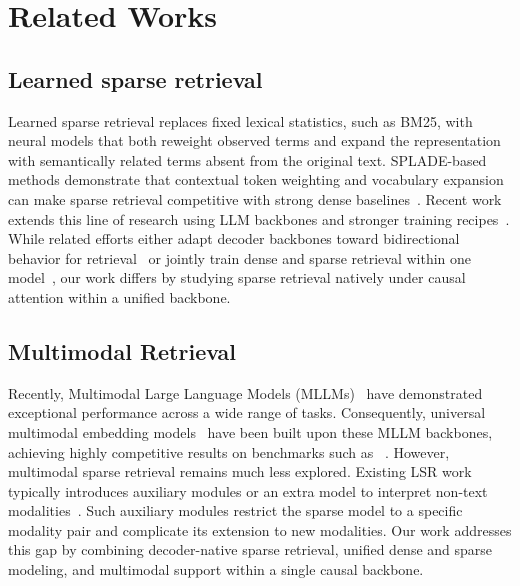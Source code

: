 \section{Related Works}

\label{sec:related-works}

\subsection{Learned sparse retrieval}
Learned sparse retrieval replaces fixed lexical statistics, such as BM25, with neural models that both reweight observed terms and expand the representation with semantically related terms absent from the original text. SPLADE-based methods demonstrate that contextual token weighting and vocabulary expansion can make sparse retrieval competitive with strong dense baselines~\citep{spladev1, spladev2, spladev3}. Recent work extends this line of research using LLM backbones and stronger training recipes~\citep{laconic}. While related efforts either adapt decoder backbones toward bidirectional behavior for retrieval~\citep{laconic} or jointly train dense and sparse retrieval within one model~\citep{bgem3,sparsejoint}, our work differs by studying sparse retrieval natively under causal attention within a unified backbone. 

\subsection{Multimodal Retrieval}
Recently, Multimodal Large Language Models (MLLMs)~\citep{gemini2, qwen3vl2025, gpt5} have demonstrated exceptional performance across a wide range of tasks. Consequently, universal multimodal embedding models~\citep{ vlm2vec, thinkthenembed2025, qwenvlembedding} have been built upon these MLLM backbones, achieving highly competitive results on benchmarks such as \mmebv~\citep{vlm2vecv2}. However, multimodal sparse retrieval remains much less explored. Existing LSR work typically introduces auxiliary modules or an extra model to interpret non-text modalities~\citep{visualsparta, stair, blipsparse, frozen, splare}. Such auxiliary modules restrict the sparse model to a specific modality pair and complicate its extension to new modalities. Our work addresses this gap by combining decoder-native sparse retrieval, unified dense and sparse modeling, and multimodal support within a single causal backbone. 